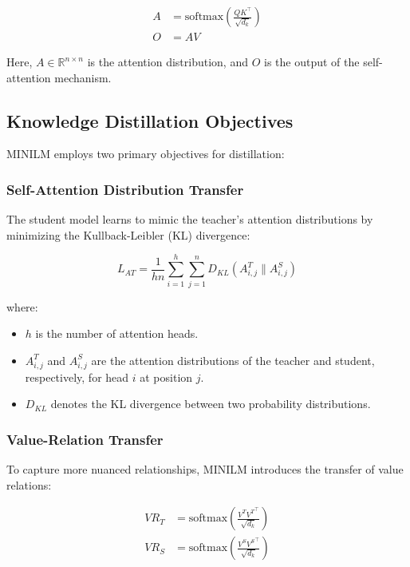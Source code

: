 \documentclass{article}
\begin{document}
\begin{align}  
    A &= \text{softmax}\left( \frac{Q K^\top}{\sqrt{d_k}} \right) \\  
    O &= A V  
\end{align}  
  
Here, $A \in \mathbb{R}^{n \times n}$ is the attention distribution, and $O$ is the output of the self-attention mechanism.  
  
\subsection{Knowledge Distillation Objectives}  
  
MINILM employs two primary objectives for distillation:  
  
\subsubsection{Self-Attention Distribution Transfer}  
  
The student model learns to mimic the teacher's attention distributions by minimizing the Kullback-Leibler (KL) divergence:  
  
\begin{equation}  
    L_{AT} = \frac{1}{h n} \sum_{i=1}^{h} \sum_{j=1}^{n} D_{KL}\left( A^T_{i,j} \| A^S_{i,j} \right)  
\end{equation}  
  
where:  
  
\begin{itemize}  
    \item $h$ is the number of attention heads.  
    \item $A^T_{i,j}$ and $A^S_{i,j}$ are the attention distributions of the teacher and student, respectively, for head $i$ at position $j$.  
    \item $D_{KL}$ denotes the KL divergence between two probability distributions.  
\end{itemize}  
  
\subsubsection{Value-Relation Transfer}  
  
To capture more nuanced relationships, MINILM introduces the transfer of value relations:  
  
\begin{align}  
    VR_T &= \text{softmax}\left( \frac{V^T {V^T}^\top}{\sqrt{d_k}} \right) \\  
    VR_S &= \text{softmax}\left( \frac{V^S {V^S}^\top}{\sqrt{d_k}} \right)  
\end{align}  
  
\end{document}
